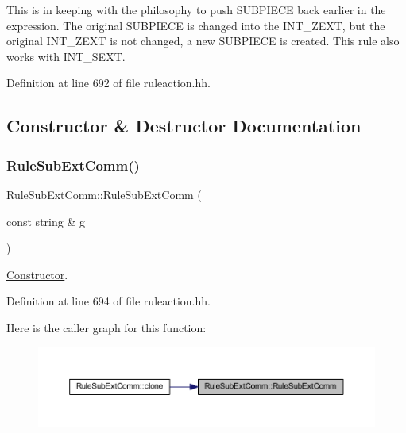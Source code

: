 This is in keeping with the philosophy to push S\+U\+B\+P\+I\+E\+CE back earlier in the expression. The original S\+U\+B\+P\+I\+E\+CE is changed into the I\+N\+T\+\_\+\+Z\+E\+XT, but the original I\+N\+T\+\_\+\+Z\+E\+XT is not changed, a new S\+U\+B\+P\+I\+E\+CE is created. This rule also works with I\+N\+T\+\_\+\+S\+E\+XT. 

Definition at line 692 of file ruleaction.\+hh.



\subsection{Constructor \& Destructor Documentation}
\mbox{\label{class_rule_sub_ext_comm_a3e72c0fde5dd24a4ce8c6d528b6b25e2}} 
\subsubsection{\texorpdfstring{RuleSubExtComm()}{RuleSubExtComm()}}
{\footnotesize\ttfamily Rule\+Sub\+Ext\+Comm\+::\+Rule\+Sub\+Ext\+Comm (\begin{DoxyParamCaption}\item[{const string \&}]{g }\end{DoxyParamCaption})\hspace{0.3cm}{\ttfamily [inline]}}



\mbox{\hyperlink{class_constructor}{Constructor}}. 



Definition at line 694 of file ruleaction.\+hh.

Here is the caller graph for this function\+:
\nopagebreak
\begin{figure}[H]
\begin{center}
\leavevmode
\includegraphics[width=350pt]{class_rule_sub_ext_comm_a3e72c0fde5dd24a4ce8c6d528b6b25e2_icgraph}
\end{center}
\end{figure}


